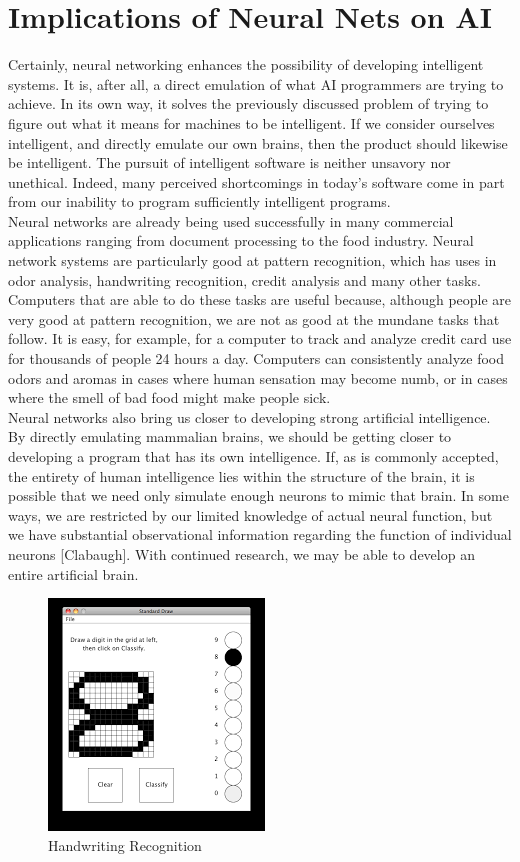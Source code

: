 \section{Implications of Neural Nets on AI}
Certainly, neural networking enhances the possibility of developing intelligent
systems. It is, after all, a direct emulation of what AI programmers are trying to achieve.
In its own way, it solves the previously discussed problem of trying to figure out what it
means for machines to be intelligent. If we consider ourselves intelligent, and directly
emulate our own brains, then the product should likewise be intelligent. The pursuit of intelligent software is neither unsavory nor unethical. Indeed, many perceived
shortcomings in today’s software come in part from our inability to program sufficiently
intelligent programs.\\
Neural networks are already being used successfully in many commercial
applications ranging from document processing to the food industry. Neural network
systems are particularly good at pattern recognition, which has uses in odor analysis,
handwriting recognition, credit analysis and many other tasks. Computers that
are able to do these tasks are useful because, although people are very good at pattern
recognition, we are not as good at the mundane tasks that follow. It is easy, for example,
for a computer to track and analyze credit card use for thousands of people 24 hours a
day. Computers can consistently analyze food odors and aromas in cases where human
sensation may become numb, or in cases where the smell of bad food might make people
sick.\\
Neural networks also bring us closer to developing strong artificial intelligence.
By directly emulating mammalian brains, we should be getting closer to developing a
program that has its own intelligence. If, as is commonly accepted, the entirety of human
intelligence lies within the structure of the brain, it is possible that we need only simulate
enough neurons to mimic that brain. In some ways, we are restricted by our limited
knowledge of actual neural function, but we have substantial observational information
regarding the function of individual neurons [Clabaugh]. With continued research, we
may be able to develop an entire artificial brain.\\

\begin{figure}[H]
    \centering
    \includegraphics{images/hand.png}
    \caption{Handwriting Recognition}
    \label{fig:my_label}
\end{figure}

